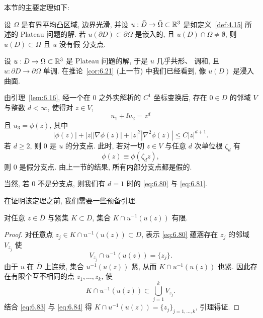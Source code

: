 本节的主要定理如下:

\begin{theorem}[假分支点的不存在性]
\label{thm:6.23}
设 $\Omega$ 是有界平均凸区域, 边界光滑, 并设
$u:\bar{D}\to\bar{\Omega}\subset\mathbb{R}^3$ 是如定义~\ref{def:4.15} 所述的
Plateau 问题的解. 若 $u(\partial D)\subset\partial\Omega$ 是嵌入的, 且
$u(D)\cap\Omega\neq\emptyset$, 则 $u(D)\subset\Omega$ 且 $u$ 没有假
分支点.
\end{theorem}

设 $u:D\to\Omega\subset\mathbb{R}^3$ 是 Plateau 问题的解, 于是 $u$ 几乎共形、
调和, 且 $u:\partial D\to\partial\Omega$ 单调. 在推论~\ref{cor:6.21}
(上一节) 中我们已经看到, 像 $u(D)$ 是浸入曲面.

由引理~\ref{lem:6.16}, 经一个在 $0$ 之外实解析的 $C^1$ 坐标变换后, 存在
$0\in D$ 的邻域 $V$ 与整数 $d<\infty$, 使得对 $z\in V$,
\begin{equation}
u_1+\ii u_2=z^d
\label{eq:6.80}
\end{equation}
且 $u_3=\phi(z)$, 其中
\begin{equation}
|\phi(z)|+|z||\nabla\phi(z)|+|z|^2|\nabla^2\phi(z)|\leq C|z|^{d+1}.
\label{eq:6.81}
\end{equation}
若 $d\geq2$, 则 $0$ 是 $u$ 的分支点. 此时, 若对一切 $z\in V$ 与任意
$d$ 次单位根 $\zeta_d$ 有
\begin{equation}
\phi(z)\equiv\phi(\zeta_dz),
\label{eq:6.82}
\end{equation}
则 $0$ 是假分支点. 由上一节的结果, 所有内部分支点都是假的.

当然, 若 $0$ 不是分支点, 则我们有 $d=1$ 时的 \eqref{eq:6.80} 与
\eqref{eq:6.81}.

在证明该定理之前, 我们需要一些预备引理.

\begin{lemma}
\label{lem:6.24}
对任意 $z\in\bar{D}$ 与紧集 $K\subset D$, 集合 $K\cap u^{-1}(u(z))$ 有限.
\end{lemma}

\begin{proof}
对任意点 $z_j\in K\cap u^{-1}(u(z))\subset D$, 表示 \eqref{eq:6.80}
蕴涵存在 $z_j$ 的邻域 $V_{z_j}$ 使
\begin{equation}
V_{z_j}\cap u^{-1}(u(z))=\{z_j\}.
\label{eq:6.83}
\end{equation}
由于 $u$ 在 $\bar{D}$ 上连续, 集合 $u^{-1}(u(z))$ 紧, 从而
$K\cap u^{-1}(u(z))$ 也紧. 因此存在有限个互不相同的点
$z_1,\ldots,z_k$, 使
\begin{equation}
K\cap u^{-1}(u(z))\subset\bigcup_{j=1}^{k}V_{z_j}.
\label{eq:6.84}
\end{equation}
结合 \eqref{eq:6.83} 与 \eqref{eq:6.84} 得
$K\cap u^{-1}(u(z))=\{z_j\}_{j=1,\ldots,k}$, 引理得证.
\end{proof}

